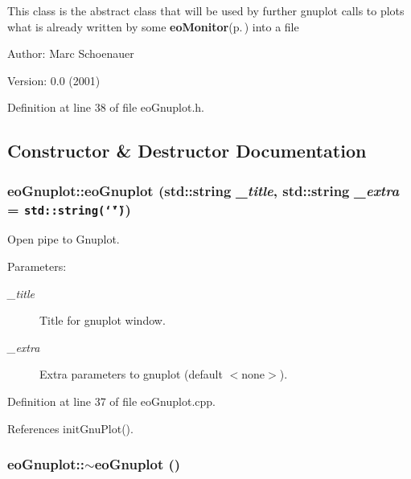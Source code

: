 This class is the abstract class that will be used by further gnuplot calls to plots what is already written by some {\bf eo\-Monitor}{\rm (p.\,\pageref{classeo_monitor})} into a file

\begin{Desc}
\item[Author:]Marc Schoenauer \end{Desc}
\begin{Desc}
\item[Version:]0.0 (2001) \end{Desc}




Definition at line 38 of file eo\-Gnuplot.h.

\subsection{Constructor \& Destructor Documentation}
\subsubsection{\setlength{\rightskip}{0pt plus 5cm}eo\-Gnuplot::eo\-Gnuplot (std::string {\em \_\-title}, std::string {\em \_\-extra} = {\tt std::string(\char`\"{}\char`\"{})})}\label{classeo_gnuplot_a0}


Open pipe to Gnuplot. 

\begin{Desc}
\item[Parameters:]
\begin{description}
\item[{\em \_\-title}]Title for gnuplot window. \item[{\em \_\-extra}]Extra parameters to gnuplot (default $<$none$>$). \end{description}
\end{Desc}


Definition at line 37 of file eo\-Gnuplot.cpp.

References init\-Gnu\-Plot().
\subsubsection{\setlength{\rightskip}{0pt plus 5cm}eo\-Gnuplot::$\sim${\bf eo\-Gnuplot} ()\hspace{0.3cm}{\tt  [virtual]}}\label{classeo_gnuplot_a1}



